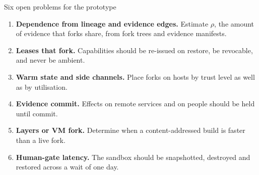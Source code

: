 \begin{frame}[t]{Six open problems for the prototype}
\begin{enumerate}
\item \textbf{Dependence from lineage and evidence edges.} Estimate $\rho$, the amount of evidence that forks share, from fork trees and evidence manifests.
\item \textbf{Leases that fork.} Capabilities should be re-issued on restore, be revocable, and never be ambient.
\item \textbf{Warm state and side channels.} Place forks on hosts by trust level as well as by utilisation.
\item \textbf{Evidence commit.} Effects on remote services and on people should be held until commit.
\item \textbf{Layers or VM fork.} Determine when a content-addressed build is faster than a live fork.
\item \textbf{Human-gate latency.} The sandbox should be snapshotted, destroyed and restored across a wait of one day.
\end{enumerate}
\end{frame}
